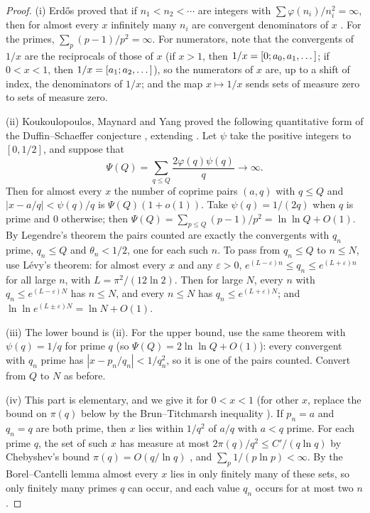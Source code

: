 \begin{proof}
(i) Erdős proved that if $n_1 < n_2 < \cdots$ are integers with $\sum \varphi(n_i)/n_i^2 = \infty$, then for almost every $x$ infinitely many $n_i$ are convergent denominators of $x$ \citep{Erdos1970}. For the primes, $\sum_p (p-1)/p^2 = \infty$. For numerators, note that the convergents of $1/x$ are the reciprocals of those of $x$ (if $x > 1$, then $1/x = [0; a_0, a_1, \dots]$; if $0 < x < 1$, then $1/x = [a_1; a_2, \dots]$), so the numerators of $x$ are, up to a shift of index, the denominators of $1/x$; and the map $x \mapsto 1/x$ sends sets of measure zero to sets of measure zero.

(ii) Koukoulopoulos, Maynard and Yang proved the following quantitative form of the Duffin--Schaeffer conjecture \citep{KMY2024}, extending \citep{KoukoulopoulosMaynard2020}. Let $\psi$ take the positive integers to $[0, 1/2]$, and suppose that
\[
  \Psi(Q) = \sum_{q \le Q}\frac{2\varphi(q)\psi(q)}{q} \to \infty.
\]
Then for almost every $x$ the number of coprime pairs $(a, q)$ with $q \le Q$ and $|x - a/q| < \psi(q)/q$ is $\Psi(Q)(1 + o(1))$. Take $\psi(q) = 1/(2q)$ when $q$ is prime and $0$ otherwise; then $\Psi(Q) = \sum_{p \le Q}(p-1)/p^2 = \ln\ln Q + O(1)$. By Legendre's theorem the pairs counted are exactly the convergents with $q_n$ prime, $q_n \le Q$ and $\theta_n < 1/2$, one for each such $n$. To pass from $q_n \le Q$ to $n \le N$, use Lévy's theorem: for almost every $x$ and any $\varepsilon > 0$, $e^{(L-\varepsilon)n} \le q_n \le e^{(L+\varepsilon)n}$ for all large $n$, with $L = \pi^2/(12\ln 2)$. Then for large $N$, every $n$ with $q_n \le e^{(L-\varepsilon)N}$ has $n \le N$, and every $n \le N$ has $q_n \le e^{(L+\varepsilon)N}$; and $\ln\ln e^{(L\pm\varepsilon)N} = \ln N + O(1)$.

(iii) The lower bound is (ii). For the upper bound, use the same theorem with $\psi(q) = 1/q$ for prime $q$ (so $\Psi(Q) = 2\ln\ln Q + O(1)$): every convergent with $q_n$ prime has $|x - p_n/q_n| < 1/q_n^2$, so it is one of the pairs counted. Convert from $Q$ to $N$ as before.

(iv) This part is elementary, and we give it for $0 < x < 1$ (for other $x$, replace the bound on $\pi(q)$ below by the Brun--Titchmarsh inequality \citep{MontgomeryVaughan1973}). If $p_n = a$ and $q_n = q$ are both prime, then $x$ lies within $1/q^2$ of $a/q$ with $a < q$ prime. For each prime $q$, the set of such $x$ has measure at most $2\pi(q)/q^2 \le C'/(q\ln q)$ by Chebyshev's bound $\pi(q) = O(q/\ln q)$ \citep[Thm.~7]{HardyWright2008}, and $\sum_p 1/(p\ln p) < \infty$. By the Borel--Cantelli lemma almost every $x$ lies in only finitely many of these sets, so only finitely many primes $q$ can occur, and each value $q_n$ occurs for at most two $n$.
\end{proof}

